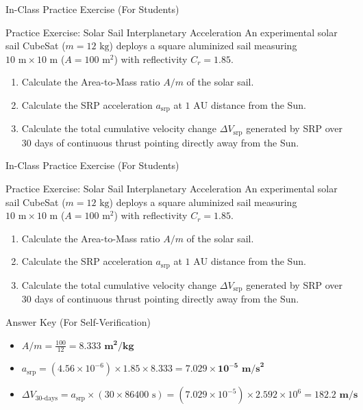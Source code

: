 \documentclass[aspectratio=169,11pt]{beamer}
\begin{document}

\begin{frame}{In-Class Practice Exercise (For Students)}
    \begin{block}{Practice Exercise: Solar Sail Interplanetary Acceleration}
        An experimental solar sail CubeSat ($m = 12\text{ kg}$) deploys a square aluminized sail measuring $10\text{ m} \times 10\text{ m}$ ($A = 100\text{ m}^2$) with reflectivity $C_r = 1.85$.
        \begin{enumerate}
            \item Calculate the Area-to-Mass ratio $A/m$ of the solar sail.
            \item Calculate the SRP acceleration $a_{\text{srp}}$ at $1\text{ AU}$ distance from the Sun.
            \item Calculate the total cumulative velocity change $\Delta V_{\text{srp}}$ generated by SRP over 30 days of continuous thrust pointing directly away from the Sun.
        \end{enumerate}
    \end{block}
\end{frame}

\begin{frame}{In-Class Practice Exercise (For Students)}
    \begin{block}{Practice Exercise: Solar Sail Interplanetary Acceleration}
        An experimental solar sail CubeSat ($m = 12\text{ kg}$) deploys a square aluminized sail measuring $10\text{ m} \times 10\text{ m}$ ($A = 100\text{ m}^2$) with reflectivity $C_r = 1.85$.
        \begin{enumerate}
            \item Calculate the Area-to-Mass ratio $A/m$ of the solar sail.
            \item Calculate the SRP acceleration $a_{\text{srp}}$ at $1\text{ AU}$ distance from the Sun.
            \item Calculate the total cumulative velocity change $\Delta V_{\text{srp}}$ generated by SRP over 30 days of continuous thrust pointing directly away from the Sun.
        \end{enumerate}
    \end{block}

    \medskip

    \begin{exampleblock}{Answer Key (For Self-Verification)}
        \begin{itemize}
            \item $A/m = \frac{100}{12} = \mathbf{8.333\text{ m}^2/\text{kg}}$
            \item $a_{\text{srp}} = (4.56 \times 10^{-6}) \times 1.85 \times 8.333 = \mathbf{7.029 \times 10^{-5}\text{ m/s}^2}$
            \item $\Delta V_{\text{30-days}} = a_{\text{srp}} \times (30 \times 86400\text{ s}) = (7.029 \times 10^{-5}) \times 2.592 \times 10^6 = \mathbf{182.2\text{ m/s}}$
        \end{itemize}
    \end{exampleblock}
\end{frame}
\end{document}
